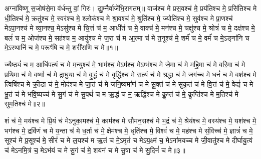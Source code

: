 

अग्ना॑विष्णू स॒जोष॑से॒मा व॑र्धन्तु वां॒ गिरः॑। द्यु॒म्नैर्वाजे॑भि॒रा\-ग॑तम्॥
वाज॑श्च मे प्रस॒वश्च॑ मे॒ प्रय॑तिश्च मे॒ प्रसि॑तिश्च मे धी॒तिश्च॑ मे॒ क्रतु॑श्च मे॒ स्वर॑श्च मे॒ श्लोक॑श्च मे श्रा॒वश्च॑ मे॒ श्रुति॑श्च मे॒ ज्योति॑श्च मे॒ सुव॑श्च मे प्रा॒णश्च॑ मेऽपा॒नश्च॑ मे व्या॒नश्च॒ मेऽसु॑श्च मे चि॒त्तं च॑ म॒ आधी॑तं च मे॒ वाक्च॑ मे॒ मन॑श्च मे॒ चक्षु॑श्च मे॒ श्रोत्रं॑ च मे॒ दक्ष॑श्च मे॒ बलं॑ च म॒ ओज॑श्च मे॒ सह॑श्च म॒ आयु॑श्च मे ज॒रा च॑ म आ॒त्मा च॑ मे त॒नूश्च॑ मे॒ शर्म॑ च मे॒ वर्म॑ च मे॒ऽङ्गा॑नि च मे॒ऽस्थानि॑ च मे॒ परूꣳ॑षि च मे॒ शरी॑राणि च मे॥१॥



ज्यैष्ठ्यं॑ च म॒ आधि॑पत्यं च मे म॒न्युश्च॑ मे॒ भाम॑श्च॒ मेऽम॑श्च॒ मेऽम्भ॑श्च मे जे॒मा च॑ मे महि॒मा च॑ मे वरि॒मा च॑ मे प्रथि॒मा च॑ मे व॒र्ष्मा च॑ मे द्राघु॒या च॑ मे वृ॒द्धं च॑ मे॒ वृद्धि॑श्च मे स॒त्यं च॑ मे श्र॒द्धा च॑ मे॒ जग॑च्च मे॒ धनं॑ च मे॒ वश॑श्च मे॒ त्विषि॑श्च मे क्री॒डा च॑ मे॒ मोद॑श्च मे जा॒तं च॑ मे जनि॒ष्यमा॑णं च मे सू॒क्तं च॑ मे सुकृ॒तं च॑ मे वि॒त्तं च॑ मे॒ वेद्यं॑ च मे भू॒तं च॑ मे भवि॒ष्यच्च॑ मे सु॒गं च॑ मे सु॒पथं॑ च म ऋ॒द्धं च॑ म॒ ऋद्धि॑श्च मे कॢ॒प्तं च॑ मे॒ कॢप्ति॑श्च मे म॒तिश्च॑ मे सुम॒तिश्च॑ मे॥२॥



शं च॑ मे॒ मय॑श्च मे प्रि॒यं च॑ मेऽनुका॒मश्च॑ मे॒ काम॑श्च मे सौमन॒सश्च॑ मे भ॒द्रं च॑ मे॒ श्रेय॑श्च मे॒ वस्य॑श्च मे॒ यश॑श्च मे॒ भग॑श्च मे॒ द्रवि॑णं च मे य॒न्ता च॑ मे ध॒र्ता च॑ मे॒ क्षेम॑श्च मे॒ धृति॑श्च मे॒ विश्वं॑ च मे॒ मह॑श्च मे सं॒विच्च॑ मे॒ ज्ञात्रं॑ च मे॒ सूश्च॑ मे प्र॒सूश्च॑ मे॒ सीरं॑ च मे ल॒यश्च॑ म ऋ॒तं च॑ मे॒ऽमृतं॑ च मेऽय॒क्ष्मं च॒ मेऽना॑मयच्च मे जी॒वातु॑श्च मे दीर्घायु॒त्वं च॑ मेऽनमि॒त्रं च॒ मेऽभ॑यं च मे सु॒गं च॑ मे॒ शय॑नं च मे सू॒षा च॑ मे सु॒दिनं॑ च मे॥३॥

